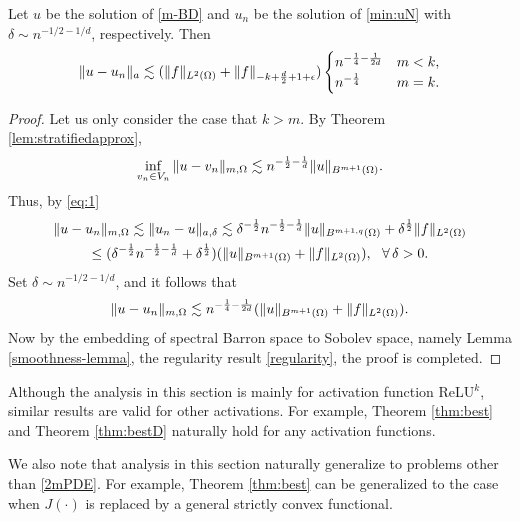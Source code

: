 \begin{theorem}
 Let $u$ be the solution of \eqref{m-BD} and
  $u_n$ be the solution of \eqref{min:uN} with $\delta\sim n^{-1/2 -1/{d}}$, respectively. Then
\begin{equation}
\label{error:D}
\|u-u_n\|_a \lesssim 
(\|f\|_{L^2(\Omega)}+\|f\|_{-k+\frac{d}{2}+1+\epsilon})
\begin{cases}
n^{-{1\over 4}-{1\over {2d}}}&m< k,
\\
n^{-{1\over 4}}& m=k.
\end{cases} 
\end{equation}  
\end{theorem}
 \begin{proof} Let us only consider the case that $k>m$. 
By Theorem \ref{lem:stratifiedapprox},
$$
\inf_{v_n\in V_n}\|u-v_n\|_{m,\Omega}\lesssim n^{-\frac12 -{1\over d}}\|u\|_{ B^{m+1}(\Omega)}.
$$
Thus, by \eqref{eq:1}
\begin{multline}
\label{eq:11}
\|u-u_n\|_{m,\Omega}\lesssim \|u_n-u\|_{a,\delta} \lesssim \delta^{-\frac12 } n^{-\frac12 -{1\over d}}\|u\|_{B^{m+1, q}(\Omega)}+\delta^{\frac12}\|f\|_{L^2(\Omega)}
\\
\le 
(\delta^{-\frac12}  n^{-\frac12 -{1\over d}}+\delta^{\frac12})(\|u\|_{ B^{m+1}(\Omega)}+\|f\|_{L^2(\Omega)}),\ \ \forall\,\delta>0.
  \end{multline}
Set $\delta\sim n^{-1/2 -1/{d}}$, and it follows that
\begin{equation}
\|u-u_n\|_{m,\Omega}\lesssim n^{-{1\over 4}-{1\over 2d}}(\|u\|_{B^{m+1}(\Omega)}+\|f\|_{L^2(\Omega)}).
\end{equation}
Now by the embedding of spectral Barron space to Sobolev space, namely
Lemma \ref{smoothness-lemma}, the regularity result
\eqref{regularity}, the proof is completed.
 \end{proof}

 \begin{remark}
Although the analysis in this section is mainly for activation
function ReLU$^k$, similar results are valid for other
activations.  For example, Theorem \ref{thm:best} and Theorem
\ref{thm:bestD} naturally hold for any activation functions. 
 \end{remark}

\begin{remark}
We also note that analysis in this section naturally
generalize to problems other than \eqref{2mPDE}.  For example, Theorem
\ref{thm:best} can be generalized to the case when $J(\cdot)$ is
replaced by a general strictly convex functional.
\end{remark}
%

